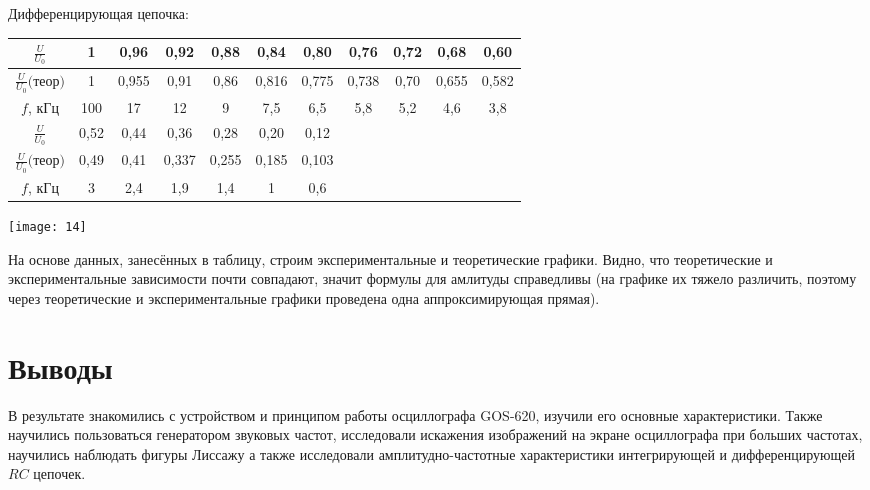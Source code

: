 \documentclass[a4paper, 12pt]{article} %
\begin{document}
Дифференцирующая цепочка:
\begin{center}
\begin{tabular}{|c|c|c|c|c|c|c|c|c|c|c|}
 \hline 
 $\frac{U}{U_0}$ & 1 & 0,96 & 0,92 & 0,88 & 0,84 & 0,80 & 0,76 & 0,72 & 0,68 & 0,60\\ 
  \hline 
 $\frac{U}{U_0} \text{(теор)}$ & 1 & 0,955 & 0,91 & 0,86 & 0,816 & 0,775 & 0,738 & 0,70 & 0,655 & 0,582\\
 \hline 
 $f$, кГц & 100 & 17 & 12 & 9 & 7,5 & 6,5 & 5,8 & 5,2 & 4,6 & 3,8 \\ 
 \hline 
 $\frac{U}{U_0}$  & 0,52 & 0,44 & 0,36 & 0,28 & 0,20 & 0,12 &&&&  \\ 
 \hline 
 $\frac{U}{U_0} \text{(теор)}$  & 0,49 & 0,41 & 0,337 & 0,255 & 0,185 & 0,103 &&&&  \\ 
 \hline 
 $f$, кГц & 3 & 2,4 & 1,9 & 1,4 & 1 & 0,6 &&&& \\ 
 \hline 
\end{tabular}
\end{center}
 
\begin{center}
    \texttt{[image: 14]}
\end{center}
 
 На основе данных, занесённых в таблицу, строим экспериментальные и теоретические графики. Видно, что теоретические и экспериментальные зависимости почти совпадают, значит формулы для амлитуды справедливы (на графике их тяжело различить, поэтому через теоретические и экспериментальные графики проведена одна аппроксимирующая прямая).


\section{Выводы}

В результате знакомились с устройством и принципом работы осциллографа GOS-620, изучили его основные характеристики. Также научились пользоваться генератором звуковых частот, исследовали искажения изображений на экране осциллографа при больших частотах, научились наблюдать фигуры Лиссажу а также исследовали амплитудно-частотные характеристики интегрирующей и дифференцирующей $RC$ цепочек.
\end{document}

